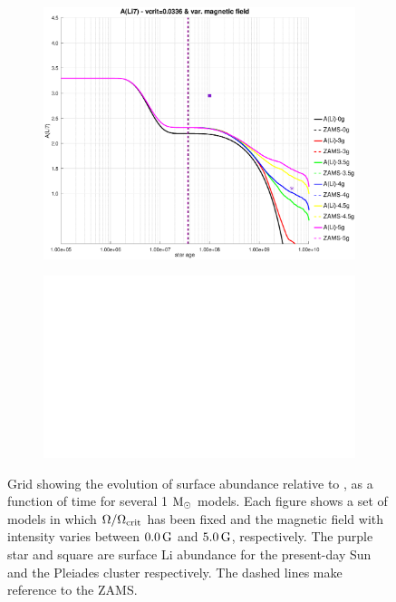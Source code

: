 \documentclass[fleqn,usenatbib]{mnras}
\begin{document}
{{\begin{figure}
\begin{subfigure}[h]{0.47\textwidth}
    \includegraphics[trim = 35mm 15mm 15mm 15mm, clip,width=\textwidth]{figures/li_vc_0336_var_g.eps}
    \label{fig:subim25}
    \end{subfigure}
    \begin{subfigure}[h]{0.47\textwidth}
    \includegraphics[width=\textwidth]{figures/blank.eps}
    \label{fig:subim26}
    \end{subfigure}
\caption{Grid showing the evolution of surface  abundance relative to , as a function of time for several 1 $\mathrm{M}_\odot$ models. Each figure shows a set of models in which $\Omega / \Omega_{\mathrm{crit}}$ has been fixed and the magnetic field with intensity varies between $0.0\,\mathrm{G}$ and $5.0\,\mathrm{G}$, respectively. The purple star and square are surface Li abundance for the present-day Sun \citep{Asplund2009} and the Pleiades cluster \citep{Sestito2005} respectively. The dashed lines make reference to the ZAMS.}
\label{fig:grid_li_var_g}
\end{figure}

}}
\end{document}
